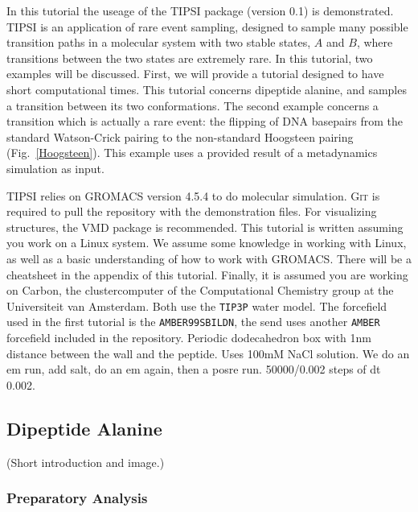 \documentclass[]{article}
\begin{document}


In this tutorial the useage of the \textsc{TIPSI} package (version 0.1) is demonstrated. \textsc{TIPSI} is an application of rare event sampling, designed to sample many possible transition paths in a molecular system with two stable states, $A$ and $B$, where transitions between the two states are extremely rare. In this tutorial, two examples will be discussed. First, we will provide a tutorial designed to have short computational times. This tutorial concerns dipeptide alanine, and samples a transition between its two conformations. The second example concerns a transition which is actually a rare event: the flipping of DNA basepairs from the standard Watson-Crick pairing to the non-standard Hoogsteen pairing (Fig.~\ref{Hoogsteen}). This example uses a provided result of a metadynamics simulation as input. 

\textsc{TIPSI} relies on \textsc{GROMACS} version 4.5.4 to do molecular simulation. \textsc{Git} is required to pull the repository with the demonstration files. For visualizing structures, the VMD package is recommended. This tutorial is written assuming you work on a Linux system. We assume some knowledge in working with Linux, as well as a basic understanding of how to work with \textsc{GROMACS}. There will be a cheatsheet in the appendix of this tutorial. Finally, it is assumed you are working on Carbon, the clustercomputer of the Computational Chemistry group at the Universiteit van Amsterdam.
Both use the \texttt{TIP3P} water model. The forcefield used in the first tutorial is the \texttt{AMBER99SBILDN}, the send uses another \texttt{AMBER} forcefield included in the repository. Periodic dodecahedron box with 1nm distance between the wall and the peptide. Uses 100mM NaCl solution. We do an em run, add salt, do an em again, then a posre run. 50000/0.002 steps of dt 0.002.

\subsection*{Dipeptide Alanine}

(Short introduction and image.)

\subsubsection*{Preparatory Analysis}
\end{document}
